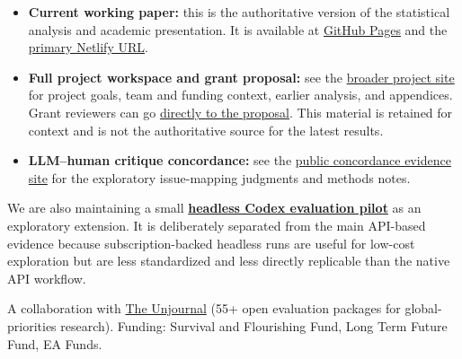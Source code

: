 \documentclass[
  11pt,
  letterpaper,
]{article}
\providecommand{\tightlist}{%
  \setlength{\itemsep}{0pt}\setlength{\parskip}{0pt}}
\begin{document}
\begin{tcolorbox}[enhanced jigsaw, colframe=quarto-callout-note-color-frame, breakable, rightrule=.15mm, toptitle=1mm, opacitybacktitle=0.6, opacityback=0, colback=white, bottomtitle=1mm, leftrule=.75mm, toprule=.15mm, coltitle=black, bottomrule=.15mm, titlerule=0mm, title=\textcolor{quarto-callout-note-color}{\faInfo}\hspace{0.5em}{Choose the right project view}, colbacktitle=quarto-callout-note-color!10!white, arc=.35mm, left=2mm]

\begin{itemize}
\tightlist
\item
  \textbf{Current working paper:} this is the authoritative version of
  the statistical analysis and academic presentation. It is available at
  \href{https://valentinklotzbuecher.github.io/llm-uj-research-eval/}{GitHub
  Pages} and the
  \href{https://llm-uj-research-eval.netlify.app/}{primary Netlify URL}.
\item
  \textbf{Full project workspace and grant proposal:} see the
  \href{https://llm-uj-research-eval-project.netlify.app/}{broader
  project site} for project goals, team and funding context, earlier
  analysis, and appendices. Grant reviewers can go
  \href{https://llm-uj-research-eval-project.netlify.app/proposal.html}{directly
  to the proposal}. This material is retained for context and is not the
  authoritative source for the latest results.
\item
  \textbf{LLM--human critique concordance:} see the
  \href{https://llm-uj-concordance-judgments.netlify.app/}{public
  concordance evidence site} for the exploratory issue-mapping judgments
  and methods notes.
\end{itemize}

We are also maintaining a small
\textbf{\href{headless_codex_pilot.html}{headless Codex evaluation
pilot}} as an exploratory extension. It is deliberately separated from
the main API-based evidence because subscription-backed headless runs
are useful for low-cost exploration but are less standardized and less
directly replicable than the native API workflow.

A collaboration with \href{https://www.unjournal.org/}{The Unjournal}
(55+ open evaluation packages for global-priorities research). Funding:
Survival and Flourishing Fund, Long Term Future Fund, EA Funds.

\end{tcolorbox}
\end{document}
